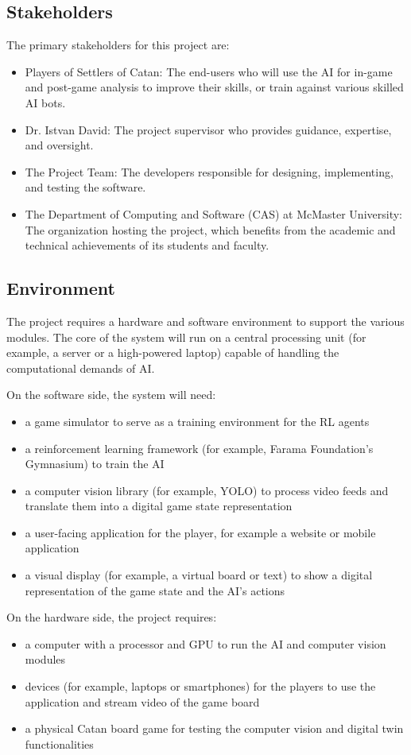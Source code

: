 \documentclass{article}
\begin{document}
\subsection{Stakeholders}
The primary stakeholders for this project are:
\begin{itemize}
    \item Players of Settlers of Catan: The end-users who will use the AI for in-game and post-game analysis to improve their skills, or train against various skilled AI bots.
    \item Dr. Istvan David: The project supervisor who provides guidance, expertise, and oversight.
    \item The Project Team: The developers responsible for designing, implementing, and testing the software.
    \item The Department of Computing and Software (CAS) at McMaster University: The organization hosting the project, which benefits from the academic and technical achievements of its students and faculty.
\end{itemize}

\subsection{Environment}
The project requires a hardware and software environment to support the various modules. The core of the system will run on a central processing unit (for example, a server or a high-powered laptop) capable of handling the computational demands of AI. 

On the software side, the system will need:
\begin{itemize}
    \item a game simulator to serve as a training environment for the RL agents
    \item a reinforcement learning framework (for example, Farama Foundation's Gymnasium) to train the AI
    \item a computer vision library (for example, YOLO) to process video feeds and translate them into a digital game state representation
    \item a user-facing application for the player, for example a website or mobile application 
    \item a visual display (for example, a virtual board or text) to show a digital representation of the game state and the AI's actions
\end{itemize}

On the hardware side, the project requires:
\begin{itemize}
    \item a computer with a processor and GPU to run the AI and computer vision modules
    \item  devices (for example, laptops or smartphones) for the players to use the application and stream video of the game board
    \item a physical Catan board game for testing the computer vision and digital twin functionalities
\end{itemize}
\end{document}
